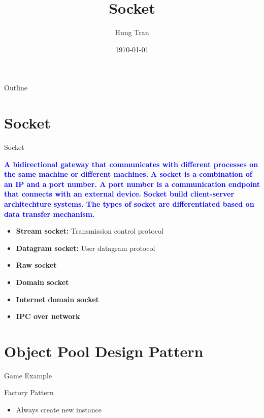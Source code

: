 \documentclass[13pt]{beamer}
\title[IPCs]{Socket}
\author{Hung Tran}
\institute{Fpt software}
\date{\today}
\begin{document}
\begin{frame}
  \titlepage
\end{frame}

\begin{frame}{Outline}
  \tableofcontents
\end{frame}

\section{Socket}

\begin{frame}{Socket}
	\begin{center}
	\textcolor{blue}{\textbf{A bidirectional gateway that communicates with different processes on the same machine or different machines.}}
	\textcolor{blue}{\textbf{A socket is a combination of an IP and a port number. A port number is a communication endpoint that connects with an external device.}}
	\textcolor{blue}{\textbf{Socket build client-server architechture systems.}}
	\textcolor{blue}{\textbf{The types of socket are differentiated based on data transfer mechanism.}}
	\end{center}
	\begin{itemize}
		\setlength\itemsep{1em}
		\item \textbf{Stream socket: } Transmission control protocol
		\item \textbf{Datagram socket: } User datagram protocol
		\item \textbf{Raw socket}
		\item \textbf{Domain socket}
		\item \textbf{Internet domain socket}
		\item \textbf{IPC over network}
	\end{itemize}
\end{frame}

\section{Object Pool Design Pattern}

\begin{frame}{Game Example}
\end{frame}

\begin{frame}{Factory Pattern}
\begin{itemize}
\item Always create new instance
\end{itemize}
\end{frame}
\end{document}
